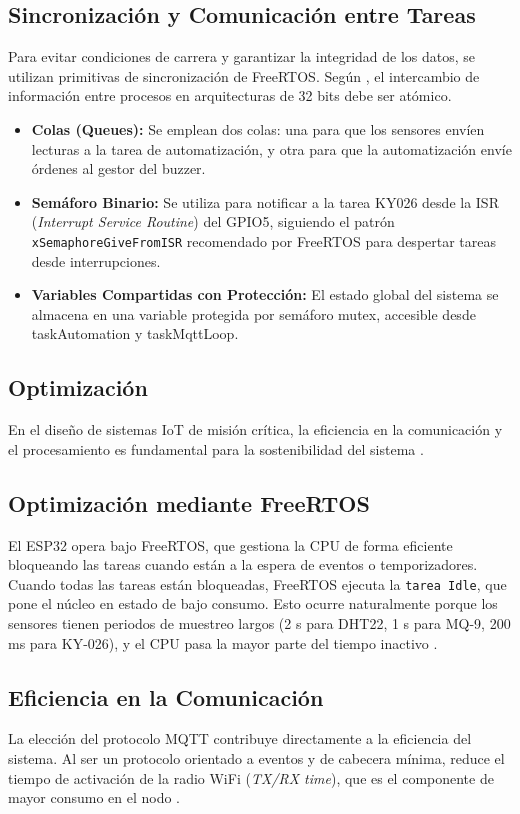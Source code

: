\subsection{Sincronización y Comunicación entre Tareas}
Para evitar condiciones de carrera y garantizar la integridad de los datos, se utilizan primitivas de sincronización de FreeRTOS. Según \citet{mazidi2014}, el intercambio de información entre procesos en arquitecturas de 32 bits debe ser atómico.
\begin{itemize}
    \item \textbf{Colas (Queues):} Se emplean dos colas: una para que los sensores envíen lecturas a la tarea de automatización, y otra para que la automatización envíe órdenes al gestor del buzzer.
    \item \textbf{Sem\'aforo Binario:} Se utiliza para notificar a la tarea KY026 desde la ISR (\textit{Interrupt Service Routine}) del GPIO5, siguiendo el patrón \texttt{xSemaphoreGiveFromISR} recomendado por FreeRTOS para despertar tareas desde interrupciones.
    \item \textbf{Variables Compartidas con Protección:} El estado global del sistema se almacena en una variable protegida por semáforo mutex, accesible desde taskAutomation y taskMqttLoop.
\end{itemize}

\subsection{Optimización}

En el diseño de sistemas IoT de misión crítica, la eficiencia en la comunicación y el procesamiento es fundamental para la sostenibilidad del sistema \citep{boylestad2009}.

\subsection{Optimización mediante FreeRTOS}
El ESP32 opera bajo FreeRTOS, que gestiona la CPU de forma eficiente bloqueando las tareas cuando están a la espera de eventos o temporizadores. Cuando todas las tareas están bloqueadas, FreeRTOS ejecuta la \texttt{tarea Idle}, que pone el núcleo en estado de bajo consumo. Esto ocurre naturalmente porque los sensores tienen periodos de muestreo largos (2 s para DHT22, 1 s para MQ-9, 200 ms para KY-026), y el CPU pasa la mayor parte del tiempo inactivo \citep{valvano2014volume1}.

\subsection{Eficiencia en la Comunicación}
La elección del protocolo MQTT contribuye directamente a la eficiencia del sistema. Al ser un protocolo orientado a eventos y de cabecera mínima, reduce el tiempo de activación de la radio WiFi (\textit{TX/RX time}), que es el componente de mayor consumo en el nodo \citep{mazidi2014}.
